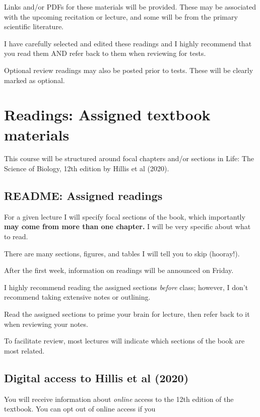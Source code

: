 \documentclass[
]{book}
\begin{document}
Links and/or PDFs for these materials will be provided. These may be associated with the upcoming recitation or lecture, and some will be from the primary scientific literature.

I have carefully selected and edited these readings and I highly recommend that you read them AND refer back to them when reviewing for tests.

Optional review readings may also be posted prior to tests. These will be clearly marked as optional.

\hypertarget{textbook}{%
\chapter{Readings: Assigned textbook materials}\label{textbook}}

This course will be structured around focal chapters and/or sections in Life: The Science of Biology, 12th edition by Hillis et al (2020).

\hypertarget{readme-assigned-readings}{%
\section{README: Assigned readings}\label{readme-assigned-readings}}

For a given lecture I will specify focal sections of the book, which importantly \textbf{may come from more than one chapter.} I will be very specific about what to read.

There are many sections, figures, and tables I will tell you to skip (hooray!).

After the first week, information on readings will be announced on Friday.

I highly recommend reading the assigned sections \emph{before} class; however, I don't recommend taking extensive notes or outlining.

Read the assigned sections to prime your brain for lecture, then refer back to it when reviewing your notes.

To facilitate review, most lectures will indicate which sections of the book are most related.

\hypertarget{digital-access-to-hillis-et-al-2020}{%
\section{Digital access to Hillis et al (2020)}\label{digital-access-to-hillis-et-al-2020}}

You will receive information about \emph{online} access to the 12th edition of the textbook. You can opt out of online access if you
\end{document}
